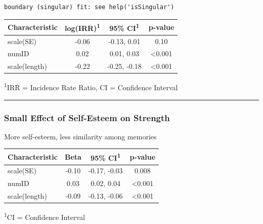 \documentclass[
  .7em,
  letterpaper,
  DIV=11,
  numbers=noendperiod]{scrartcl}
\begin{document}
\begin{verbatim}
boundary (singular) fit: see help('isSingular')
\end{verbatim}

\captionsetup[table]{labelformat=empty,skip=1pt}
\setlength{\LTpost}{0mm}
\begin{longtable}{lccc}
\toprule
\textbf{Characteristic} & \textbf{log(IRR)}\textsuperscript{1} & \textbf{95\% CI}\textsuperscript{1} & \textbf{p-value} \\ 
\midrule
scale(SE) & -0.06 & -0.13, 0.01 & 0.10 \\ 
numID & 0.02 & 0.01, 0.03 & <0.001 \\ 
scale(length) & -0.22 & -0.25, -0.18 & <0.001 \\ 
\bottomrule
\end{longtable}
\begin{minipage}{\linewidth}
\textsuperscript{1}IRR = Incidence Rate Ratio, CI = Confidence Interval\\
\end{minipage}

\begin{center}\rule{0.5\linewidth}{0.5pt}\end{center}

\hypertarget{small-effect-of-self-esteem-on-strength}{%
\subsubsection{Small Effect of Self-Esteem on
Strength}\label{small-effect-of-self-esteem-on-strength}}

More self-esteem, less similarity among memories

\captionsetup[table]{labelformat=empty,skip=1pt}
\setlength{\LTpost}{0mm}
\begin{longtable}{lccc}
\toprule
\textbf{Characteristic} & \textbf{Beta} & \textbf{95\% CI}\textsuperscript{1} & \textbf{p-value} \\ 
\midrule
scale(SE) & -0.10 & -0.17, -0.03 & 0.008 \\ 
numID & 0.03 & 0.02, 0.04 & <0.001 \\ 
scale(length) & -0.09 & -0.13, -0.06 & <0.001 \\ 
\bottomrule
\end{longtable}
\begin{minipage}{\linewidth}
\textsuperscript{1}CI = Confidence Interval\\
\end{minipage}
\end{document}
